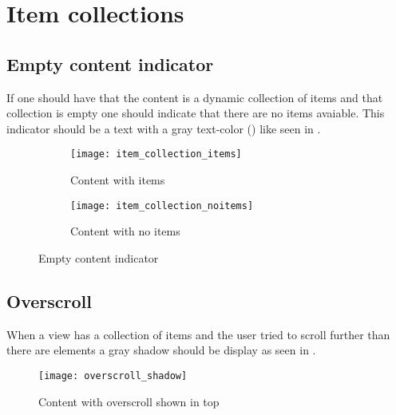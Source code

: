 
\chapter{Item collections}

\section{Empty content indicator}
\label{sec:empty_content_indicator}


If one should have that the content is a dynamic collection of items and that collection is empty one should indicate that there are no items avaiable. This indicator should be a text with a gray text-color () like seen in .

\begin{figure}
    \centering
    \begin{subfigure}[t]{0.4\textwidth}
        \centering
        \texttt{[image: item\_collection\_items]}
        \caption{Content with items}
        \label{fig:empty_content_items}
    \end{subfigure}
    \hspace{5em} 
    \begin{subfigure}[t]{0.4\textwidth}
        \centering
        \texttt{[image: item\_collection\_noitems]}
        \caption{Content with no items}
        \label{fig:empty_content_noitems}
    \end{subfigure}
    
    \caption{Empty content indicator}
    \label{fig:empty_content}
\end{figure}

\FloatBarrier

\section{Overscroll}
\label{sec:overscroll}

When a view has a collection of items and the user tried to scroll further than there are elements a gray shadow should be display as seen in .

\begin{figure}[h]
    \centering
    \texttt{[image: overscroll\_shadow]}
    \caption{Content with overscroll shown in top}
    \label{fig:overscroll}
\end{figure}

